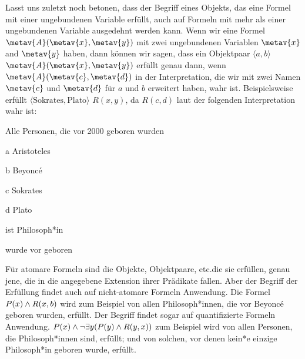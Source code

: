 Lasst uns zuletzt noch betonen, dass der Begriff eines Objekts, das eine Formel mit einer ungebundenen Variable erfüllt, auch auf Formeln mit mehr als einer ungebundenen Variable ausgedehnt werden kann. Wenn wir eine Formel $\metav{A}(\metav{x},\metav{y})$ mit zwei ungebundenen Variablen $\metav{x}$ and $\metav{y}$ haben, dann können wir sagen, dass ein Objektpaar $\langle a, b\rangle$ $\metav{A}(\metav{x},\metav{y})$ erfüllt genau dann, wenn $\metav{A}(\metav{c},\metav{d})$ in der Interpretation, die wir mit zwei Namen $\metav{c}$ und $\metav{d}$ für $a$ und $b$ erweitert haben, wahr ist. Beispielsweise erfüllt $\langle \text{Sokrates}, \text{Plato}\rangle$ $R(x,y)$, da $R(c,d)$ laut der folgenden Interpretation wahr ist:
\begin{ekey}
	\item[\text{Domäne}] Alle Personen, die vor 2000 geboren wurden
	\item[a] Aristoteles
	\item[b] Beyonc\'e
	\item[c] Sokrates
	\item[d] Plato
	\item[\atom{P}{x}]  ist Philosoph*in
	\item[\atom{R}{x,y}]  wurde vor  geboren
\end{ekey}
Für atomare Formeln sind die Objekte, Objektpaare, etc.\@ die sie erfüllen, genau jene, die in die angegebene Extension ihrer Prädikate fallen. Aber der Begriff der Erfüllung findet auch auf nicht-atomare Formeln Anwendung. Die Formel $\mathord{P}(x) \land \mathord{R}(x,b)$ wird zum Beispiel von allen Philosoph*innen, die vor Beyonc\'e geboren wurden, erfüllt. Der Begriff findet sogar auf quantifizierte Formeln Anwendung. $P(x) \wedge \lnot\exists y(P(y) \land R(y,x))$ zum Beispiel wird von allen Personen, die Philosoph*innen sind, erfüllt; und von solchen, vor denen kein*e einzige Philosoph*in geboren wurde, erfüllt.

